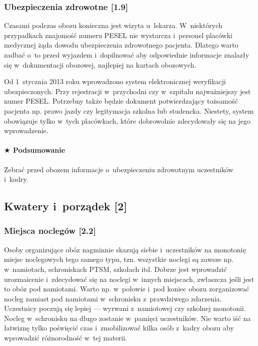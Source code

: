 \documentclass[a5paper,10pt,titlepage,twoside]{article}
\newcommand*{\thecheckbox}{\hss$\Box$} %
\newenvironment*{checklist}
{\list{}{%
\renewcommand*{\makelabel}[1]{\thecheckbox}}}
{\endlist}
\begin{document}
\subsubsection{Ubezpieczenia zdrowotne [1.9]}
Czasami podczas obozu konieczna jest wizyta u~lekarza. W~niektórych przypadkach znajomość numeru PESEL nie wystarcza i~personel placówki medycznej żąda dowodu ubezpieczenia zdrowotnego pacjenta. Dlatego warto zadbać o~to przed wyjazdem i~dopilnować aby odpowiednie informacje znalazły się w~dokumentacji obozowej, najlepiej na kartach obozowych.

Od 1~stycznia 2013 roku wprowadzono system elektronicznej weryfikacji ubezpieczonych. Przy rejestracji w~przychodni czy w~szpitalu najważniejszy jest numer PESEL. Potrzebny także będzie dokument potwierdzający tożsamość pacjenta np. prawo jazdy czy legitymacja szkolna lub studencka. Niestety, system obowiązuje tylko w~tych placówkach, które dobrowolnie zdecydowały się na jego wprowadzenie.

\paragraph{$\bigstar$ Podsumowanie}
\begin{checklist}
\item Zebrać przed obozem informacje o~ubezpieczeniu zdrowotnym uczestników i~kadry.
\end{checklist}

\subsection{Kwatery i~porządek [2]}

\subsubsection{Miejsca noclegów [2.2] \label{miejsca-noclegow}}
Osoby organizujące obóz nagminnie skazują siebie i~uczestników na monotonię miejsc noclegowych tego samego typu, tzn. wszystkie noclegi są zawsze np. w~namiotach, schroniskach PTSM, szkołach itd. Dobrze jest wprowadzić urozmaicenie i~zdecydować się na noclegi w~innych miejscach, zwłaszcza jeśli jest to obóz pod namiotami. Warto np. w~połowie i~pod koniec obozu zorganizować nocleg zamiast pod namiotami w~schronisku z~prawdziwego zdarzenia. Uczestnicy poczują się lepiej --- wyrwani z~namiotowej czy szkolnej monotonii. Nocleg w~schronisku na długo zostanie w~pamięci uczestników. Nie warto iść na łatwiznę tylko poświęcić czas i~zmobilizować kilka osób z~kadry obozu aby wprowadzić różnorodność w~tej materii.
%
\end{document}

